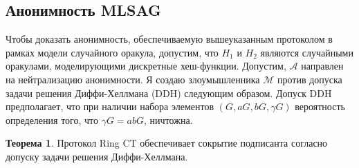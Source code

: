 \documentclass{mrl}
\theoremstyle{definition}
\newtheorem{thm}{Теорема}
\numberwithin{thm}{section}
\begin{document}
\subsection{Анонимность MLSAG}
Чтобы доказать анонимность, обеспечиваемую вышеуказанным протоколом в рамках модели случайного оракула, допустим, что $H_{1}$ и $H_{2}$ являются случайными оракулами, моделирующими дискретные хеш-функции. Допустим, $\mathcal{A}$ направлен на нейтрализацию анонимности. Я создаю злоумышленника $\mathcal{M}$ против допуска задачи решения Диффи-Хеллмана (DDH) следующим образом. Допуск DDH предполагает, что при наличии набора элементов $\left(G,aG,bG,\gamma G\right)$ вероятность определения того, что $\gamma G=abG$, ничтожна.
\begin{thm}
\label{thm:Ring-CT-protocol}Протокол Ring CT обеспечивает сокрытие подписанта согласно допуску задачи решения Диффи-Хеллмана. \end{thm}
\end{document}
